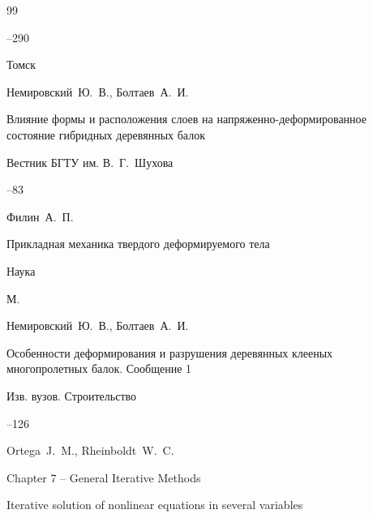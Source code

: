 \begin{thebibliography}{99}

--290

\publaddr Томск






\by Немировский~Ю.~В., Болтаев~А.~И.

\paper Влияние формы и расположения слоев на напряженно-деформированное состояние гибридных деревянных балок 

\jour Вестник \mbox{БГТУ} им. В.~Г.~Шухова




--83








\by Филин~А.~П.

\book Прикладная механика твердого деформируемого тела


\publ Наука


\publaddr М.







\by Немировский~Ю.~В., Болтаев~А.~И.

\paper Особенности деформирования и разрушения деревянных клееных многопролетных балок. Сообщение 1

\jour Изв. вузов. Строительство



--126







\by Ortega~J.~M.,  Rheinboldt~W.~C.

\paper Chapter 7 – General Iterative Methods 

\inbook Iterative solution of nonlinear equations in several variables


\end{thebibliography}
